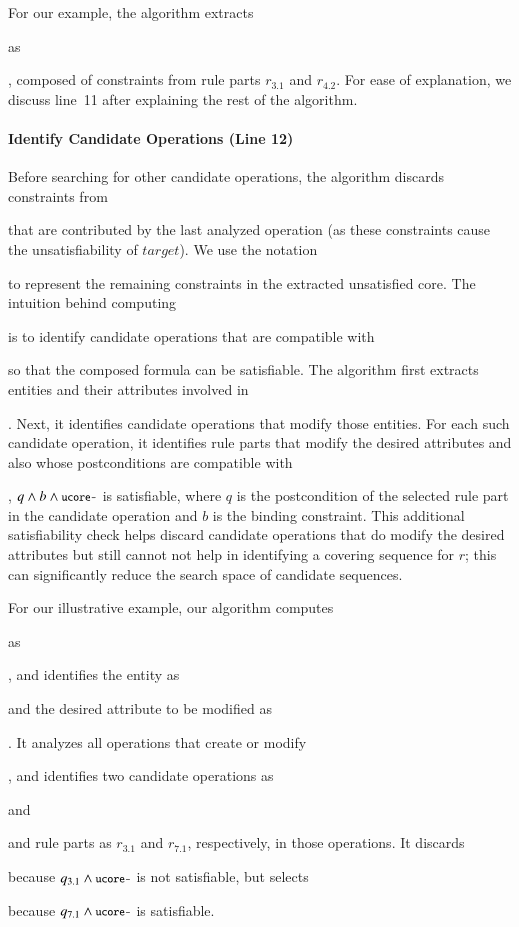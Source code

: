 For our example, the algorithm extracts \subject{ucore} as \subject{ord.total =
  0 $\wedge$ ord.total > 0}, composed of constraints from rule parts $r_{3.1}$
and $r_{4.2}$. For ease of explanation, we discuss line~11 after explaining the
rest of the algorithm.


\vskip -7pt
\paragraph*{Identify Candidate Operations (Line 12)}
Before searching for other candidate operations, the algorithm discards
constraints from \subject{ucore} that are contributed by the last analyzed
operation (as these constraints cause the unsatisfiability of $target$).  We use
the notation \subject{ucore-} to represent the remaining constraints in the
extracted unsatisfied core. The intuition behind computing \subject{ucore-} is
to identify candidate operations that are compatible with \subject{ucore-} so
that the composed formula can be satisfiable.  The algorithm first extracts
entities and their attributes involved in \subject{ucore-}. Next, it identifies
candidate operations that modify those entities.  For each such candidate
operation, it identifies rule parts that modify the desired attributes and also
whose postconditions are compatible with \subject{ucore-}, \ie{} $q \wedge b
\wedge \subject{ucore-}$ is satisfiable, where $q$ is the postcondition of the
selected rule part in the candidate operation and $b$ is the binding constraint.
This additional satisfiability check helps discard candidate operations that do
modify the desired attributes but still cannot not help in identifying a
covering sequence for $r$; this can significantly reduce the search space of
candidate sequences.

For our illustrative example, our algorithm computes \subject{ucore-} as
\subject{ord.total > 0}, and identifies the entity as \subject{Order} and the
desired attribute to be modified as \subject{total}. It analyzes all operations
that create or modify \subject{Order}, and identifies two candidate operations
as \subject{CreateOrder} and \subject{AddItemToOrder} and rule parts as
$r_{3.1}$ and $r_{7.1}$, respectively, in those operations.  It discards
\subject{CreateOrder} because $q_{3.1} \wedge \subject{ucore-}$ is not
satisfiable, but selects \subject{AddItemToOrder} because $q_{7.1} \wedge
\subject{ucore-}$ is satisfiable.

